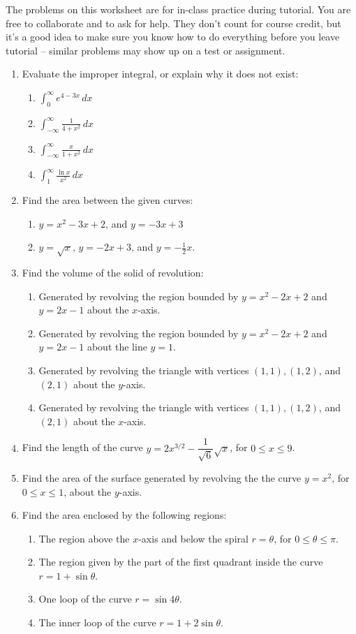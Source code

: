 \documentclass[12pt]{article}
\newcommand{\di}{\displaystyle}
\begin{document}
\thispagestyle{fancy}
The problems on this worksheet are for in-class practice during tutorial. You are free to collaborate and to ask for help. They don't count for course credit, but it's a good idea to make sure you know how to do everything before you leave tutorial -- similar problems may show up on a test or assignment.

\begin{enumerate}
 \item Evaluate the improper integral, or explain why it does not exist:
\begin{enumerate}
 \item $\di \int_0^\infty e^{4-3x}\,dx$
 \item $\di \int_{-\infty}^\infty \frac{1}{4+x^2}\,dx$
 \item $\di \int_{-\infty}^\infty \frac{x}{1+x^2}\,dx$
 \item $\di \int_1^\infty\frac{\ln x}{x^2}\,dx$
\end{enumerate}
 \item Find the area between the given curves:
\begin{enumerate}
 \item $y=x^2-3x+2$, and $y=-3x+3$
 \item $y=\sqrt{x}$, $y=-2x+3$, and $y=-\frac{1}{2}x$.
\end{enumerate}
\item Find the volume of the solid of revolution:
\begin{enumerate}
 \item Generated by revolving the region bounded by $y=x^2-2x+2$ and $y=2x-1$ about the $x$-axis.
 \item Generated by revolving the region bounded by $y=x^2-2x+2$ and $y=2x-1$ about the line $y=1$.
 \item Generated by revolving the triangle with vertices $(1,1), (1,2)$, and $(2,1)$ about the $y$-axis.
 \item Generated by revolving the triangle with vertices $(1,1), (1,2)$, and $(2,1)$ about the $x$-axis.
\end{enumerate}
\item Find the length of the curve $y=2x^{3/2}-\dfrac{1}{\sqrt{6}}\sqrt{x}$, for $0\leq x\leq 9$.
\item Find the area of the surface generated by revolving the the curve $y=x^2$, for $0\leq x\leq 1$, about the $y$-axis.
\item Find the area enclosed by the following regions:
\begin{enumerate}
 \item The region above the $x$-axis and below the spiral $r=\theta$, for $0\leq \theta \leq \pi$.
 \item The region given by the part of the first quadrant inside the curve $r=1+\sin\theta$.
 \item One loop of the curve $r=\sin 4\theta$.
 \item The inner loop of the curve $r=1+2\sin\theta$.
\end{enumerate}


\end{enumerate}
\end{document}
